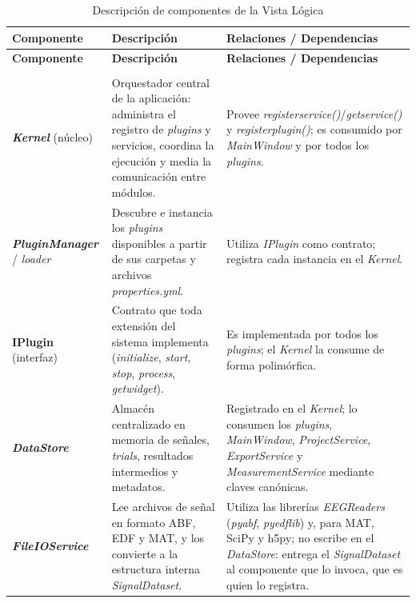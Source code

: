 \documentclass[12pt,letterpaper,oneside]{article}
\DeclareRobustCommand{\_}{\textunderscore\allowbreak}
\begin{document}
\begin{center}
\small
\begin{longtable}{|p{}|p{}|p{}|}
\hline
\textbf{Componente} & \textbf{Descripci\'on} & \textbf{Relaciones / Dependencias} \\
\hline
\endfirsthead
\hline
\textbf{Componente} & \textbf{Descripci\'on} & \textbf{Relaciones / Dependencias} \\
\hline
\endhead
\hline
\endfoot
\hline
\caption{Descripci\'on de componentes de la Vista L\'ogica} \label{tab:sdd_componentes_logica} \\
\endlastfoot

\textbf{\textit{Kernel}} (n\'ucleo) & Orquestador central de la aplicaci\'on: administra el registro de \textit{plugins} y servicios, coordina la ejecuci\'on y media la comunicaci\'on entre m\'odulos. & Provee \textit{register\_\allowbreak service()}/\textit{get\_\allowbreak service()} y \textit{register\_\allowbreak plugin()}; es consumido por \textit{MainWindow} y por todos los \textit{plugins}. \\
\hline

\textbf{\textit{PluginManager}} / \textit{loader} & Descubre e instancia los \textit{plugins} disponibles a partir de sus carpetas y archivos \textit{properties.yml}. & Utiliza \textit{IPlugin} como contrato; registra cada instancia en el \textit{Kernel}. \\
\hline

\textbf{IPlugin} (interfaz) & Contrato que toda extensi\'on del sistema implementa (\textit{initialize}, \textit{start}, \textit{stop}, \textit{process}, \textit{get\_\allowbreak widget}). & Es implementada por todos los \textit{plugins}; el \textit{Kernel} la consume de forma polim\'orfica. \\
\hline

\textbf{\textit{DataStore}} & Almac\'en centralizado en memoria de se\~nales, \textit{trials}, resultados intermedios y metadatos. & Registrado en el \textit{Kernel}; lo consumen los \textit{plugins}, \textit{MainWindow}, \textit{ProjectService}, \textit{ExportService} y \textit{MeasurementService} mediante claves can\'onicas. \\
\hline

\textbf{\textit{FileIOService}} & Lee archivos de se\~nal en formato ABF, EDF y MAT, y los convierte a la estructura interna \textit{SignalDataset}. & Utiliza las librer\'ias \textit{EEGReaders} (\textit{pyabf}, \textit{pyedflib}) y, para MAT, SciPy y h5py; no escribe en el \textit{DataStore}: entrega el \textit{SignalDataset} al componente que lo invoca, que es quien lo registra. \\
\hline


\end{longtable}
\end{center}
\end{document}
